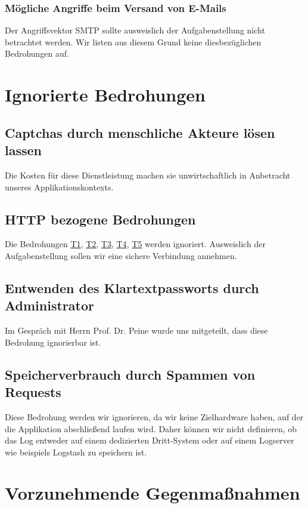 \documentclass[12pt,DIV14,BCOR10mm,a4paper,parskip=half-,headsepline,headinclude,english,ngerman,bibliography=totocnumbered]{scrreprt}
\begin{document}
\subsubsection{Mögliche Angriffe beim Versand von E-Mails}
Der Angriffsvektor SMTP sollte ausweislich der Aufgabenstellung nicht betrachtet werden. Wir listen aus diesem Grund keine diesbezüglichen Bedrohungen auf.

\newcommand{\linktothreat}[2]{\texorpdfstring{\protect\hyperlink{#1}{#2}}{}}%

\section{Ignorierte Bedrohungen}
\subsection{Captchas durch menschliche Akteure lösen lassen}
Die Kosten für diese Dienstleistung machen sie unwirtschaftlich in Anbetracht unseres Applikationskontexts.

\subsection{HTTP bezogene Bedrohungen}
Die Bedrohungen \linktothreat{threat1}{T1}, \linktothreat{threat2}{T2}, \linktothreat{threat3}{T3}, \linktothreat{threat4}{T4}, \linktothreat{threat5}{T5} werden ignoriert.
Ausweislich der Aufgabenstellung sollen wir eine sichere Verbindung annehmen.

\subsection{Entwenden des Klartextpassworts durch Administrator}
Im Gespräch mit Herrn Prof. Dr. Peine wurde uns mitgeteilt, dass diese Bedrohung ignorierbar ist.

\subsection{Speicherverbrauch durch Spammen von Requests}
Diese Bedrohung werden wir ignorieren, da wir keine Zielhardware haben, auf der die Applikation abschließend laufen wird.
Daher können wir nicht definieren, ob das Log entweder auf einem dedizierten Dritt-System oder auf einem Logserver wie beispiels Logstash zu speichern ist.

\section{Vorzunehmende Gegenmaßnahmen}
\end{document}
